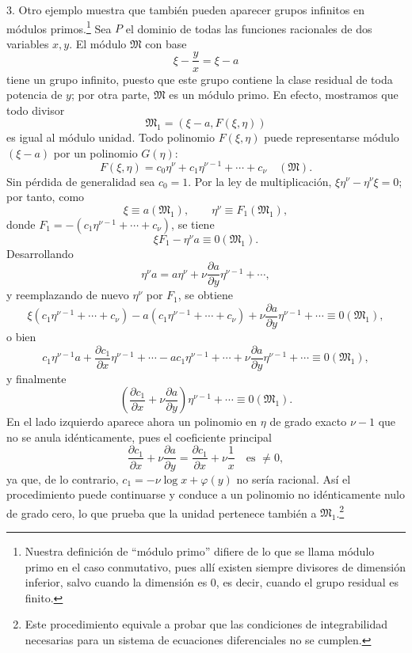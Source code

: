 \documentclass[11pt]{article}
\begin{document}
3. Otro ejemplo muestra que también pueden aparecer grupos infinitos en módulos primos.\footnote{Nuestra definición de ``módulo primo'' difiere de lo que se llama módulo primo en el caso conmutativo, pues allí existen siempre divisores de dimensión inferior, salvo cuando la dimensión es $0$, es decir, cuando el grupo residual es finito.} Sea $P$ el dominio de todas las funciones racionales de dos variables $x,y$. El módulo $\mathfrak M$ con base
\[
 \xi-\frac{y}{x}=\xi-a
\]
tiene un grupo infinito, puesto que este grupo contiene la clase residual de toda potencia de $y$; por otra parte, $\mathfrak M$ es un módulo primo. En efecto, mostramos que todo divisor
\[
 \mathfrak M_1=(\xi-a,
F(\xi,\eta))
\]
es igual al módulo unidad. Todo polinomio $F(\xi,\eta)$ puede representarse módulo $(\xi-a)$ por un polinomio $G(\eta)$:
\[
 F(\xi,
\eta)=c_0\eta^\nu+c_1\eta^{\nu-1}+\cdots+c_\nu\quad(\mathfrak M).
\]
Sin pérdida de generalidad sea $c_0=1$. Por la ley de multiplicación, $\xi\eta^\nu-\eta^\nu\xi=0$; por tanto, como
\[
 \xi\equiv a(\mathfrak M_1),
 \qquad
 \eta^\nu\equiv F_1(\mathfrak M_1),
\]
donde $F_1=-(c_1\eta^{\nu-1}+\cdots+c_\nu)$, se tiene
\[
 \xi F_1-\eta^\nu a\equiv0(\mathfrak M_1).
\]
Desarrollando
\[
 \eta^\nu a=a\eta^\nu+\nu\frac{\partial a}{\partial y}\eta^{\nu-1}+\cdots,
\]
y reemplazando de nuevo $\eta^\nu$ por $F_1$, se obtiene
\[
 \xi(c_1\eta^{\nu-1}+\cdots+c_\nu)-a(c_1\eta^{\nu-1}+\cdots+c_\nu)
 +\nu\frac{\partial a}{\partial y}\eta^{\nu-1}+\cdots\equiv0(\mathfrak M_1),
\]
o bien
\[
 c_1\eta^{\nu-1}a+\frac{\partial c_1}{\partial x}\eta^{\nu-1}+\cdots
 -ac_1\eta^{\nu-1}+\cdots+
\nu\frac{\partial a}{\partial y}\eta^{\nu-1}+\cdots
 \equiv0(\mathfrak M_1),
\]
y finalmente
\[
 \left(\frac{\partial c_1}{\partial x}+\nu\frac{\partial a}{\partial y}\right)\eta^{\nu-1}+\cdots
 \equiv0(\mathfrak M_1).
\]
En el lado izquierdo aparece ahora un polinomio en $\eta$ de grado exacto $\nu-1$ que no se anula idénticamente, pues el coeficiente principal
\[
 \frac{\partial c_1}{\partial x}+\nu\frac{\partial a}{\partial y}
 =\frac{\partial c_1}{\partial x}+\nu\frac{1}{x}
 \quad\text{es }\ne0,
\]
ya que, de lo contrario, $c_1=-\nu\log x+\varphi(y)$ no sería racional. Así el procedimiento puede continuarse y conduce a un polinomio no idénticamente nulo de grado cero, lo que prueba que la unidad pertenece también a $\mathfrak M_1$.\footnote{Este procedimiento equivale a probar que las condiciones de integrabilidad necesarias para un sistema de ecuaciones diferenciales no se cumplen.}
\end{document}

